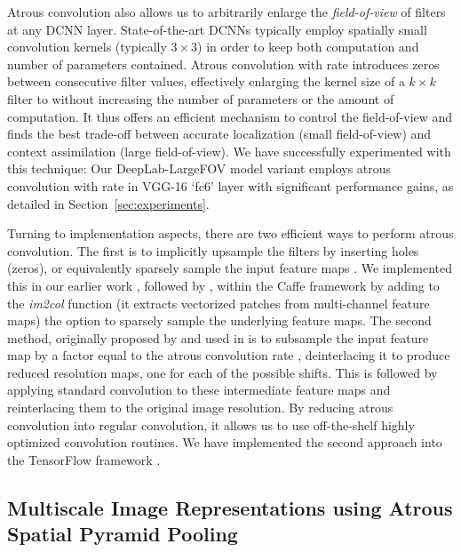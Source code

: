 \documentclass[10pt,journal,compsoc]{IEEEtran}
\newcommand{\by}[2]{\ensuremath{#1 \! \times \! #2}}
\begin{document}
Atrous convolution also allows us to arbitrarily enlarge the \emph{field-of-view} of
filters at any DCNN layer.
State-of-the-art DCNNs typically employ spatially small
convolution kernels (typically \by{3}{3}) in order to keep both computation and
number of parameters contained. Atrous convolution with rate  introduces
 zeros between consecutive filter values, effectively enlarging the kernel
size of a \by{k}{k} filter to  without increasing the
number of parameters or the amount of computation. It thus offers an efficient
mechanism to control the field-of-view and finds the best trade-off between
accurate localization (small field-of-view) and context assimilation (large
field-of-view). We have successfully experimented with this technique:
Our DeepLab-LargeFOV model variant \cite{chen2014semantic} employs atrous
convolution with rate  in VGG-16 `fc6' layer with significant
performance gains, as detailed in Section~\ref{sec:experiments}.

Turning to implementation aspects, 
there are two efficient ways to  perform atrous convolution. The first
is to implicitly upsample the filters by inserting holes (zeros), or
equivalently sparsely sample the input feature maps \cite{holschneider1989real}.
We implemented this in our earlier work \cite{papandreou2014untangling,
 chen2014semantic}, followed by \cite{yu2015multi}, within the Caffe framework
\cite{jia2014caffe} by adding to the \textsl{im2col} function (it extracts
vectorized patches from multi-channel feature maps) the option to sparsely
sample the underlying feature maps. The second method, originally proposed by
\cite{shensa1992discrete} and used in \cite{giusti2013fast, sermanet2013overfeat}
is to subsample the input feature map by a factor equal to the atrous
convolution rate , deinterlacing it to produce  reduced resolution maps,
one for each of the  possible shifts. This is followed by applying
standard convolution to these intermediate feature maps and reinterlacing them
to the original image resolution. By reducing atrous convolution into regular
convolution, it allows us to use off-the-shelf highly optimized convolution
routines. We have implemented the second approach into the TensorFlow framework
\cite{abadi2016tensorflow}.



\subsection{Multiscale Image Representations using Atrous Spatial Pyramid Pooling}
\end{document}
